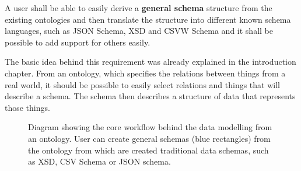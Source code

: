 \begin{requirement}
A user shall be able to easily derive a \textbf{general schema} structure from the existing ontologies and then translate the structure into different known schema languages, such as JSON Schema, XSD and CSVW Schema and it shall be possible to add support for others easily.
\label{requirement:general-schema}
\end{requirement}

The basic idea behind this requirement was already explained in the introduction chapter. From an ontology, which specifies the relations between things from a real world, it should be possible to easily select relations and things that will describe a schema. The schema then describes a structure of data that represents those things.

\begin{figure}[h!]\centering
  \caption{Diagram showing the core workflow behind the data modelling from an ontology. User can create general schemas (blue rectangles) from the ontology from which are created traditional data schemas, such as XSD, CSV Schema or JSON schema.}
\end{figure}

